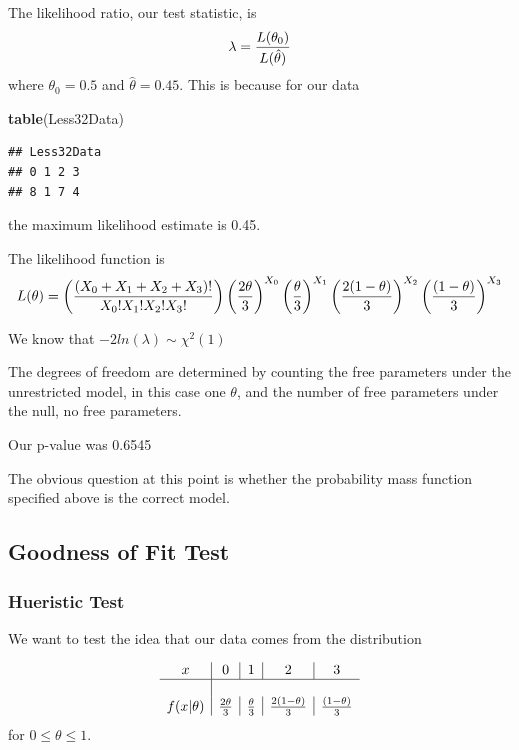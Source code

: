 \documentclass[]{book}
\newenvironment{Shaded}{\begin{snugshade}}{\end{snugshade}}
\newcommand{\KeywordTok}[1]{\textcolor[rgb]{0.13,0.29,0.53}{\textbf{#1}}}
\newcommand{\NormalTok}[1]{#1}
\theoremstyle{definition}
\theoremstyle{definition}
\theoremstyle{definition}
\theoremstyle{remark}
\begin{document}
The likelihood ratio, our test statistic, is
\[\lambda={L(\theta_{0}) \over L(\hat{\theta})}\] where
\(\theta_{0}=0.5\) and \(\hat{\theta}=0.45\). This is because for our
data

\begin{Shaded}
\begin{Highlighting}[]
\KeywordTok{table}\NormalTok{(Less32Data)}
\end{Highlighting}
\end{Shaded}

\begin{verbatim}
## Less32Data
## 0 1 2 3 
## 8 1 7 4
\end{verbatim}

the maximum likelihood estimate is 0.45.

The likelihood function is
\[L(\theta)= \left( {\left(X_{0}+X_{1}+X_{2}+X_{3} \right)! \over X_{0}!X_{1}!X_{2}!X_{3}!} \right) \left( {2 \theta \over 3} \right)^{X_{0}}\left( { \theta \over 3} \right)^{X_{1}}\left( {2 (1- \theta) \over 3} \right)^{X_{2}}\left( {(1 - \theta ) \over 3} \right)^{X_{3}}\]

We know that \(-2ln(\lambda) \sim \chi^{2}(1)\)

The degrees of freedom are determined by counting the free parameters
under the unrestricted model, in this case one \(\theta\), and the
number of free parameters under the null, no free parameters.

Our p-value was 0.6545

The obvious question at this point is whether the probability mass
function specified above is the correct model.

\subsection{Goodness of Fit Test}\label{goodness-of-fit-test}

\subsubsection{Hueristic Test}\label{hueristic-test}

We want to test the idea that our data comes from the distribution

\[
\begin{array}{c|c|c|c|c} 
x & 0 & 1 & 2 & 3 \\ \hline \\ f(x|\theta) & {2 \theta \over 3} & {\theta \over 3} & {2 (1 - \theta) \over 3} & {(1- \theta) \over 3}
\end{array} 
\] for \(0 \leq \theta \leq 1\).
\end{document}
